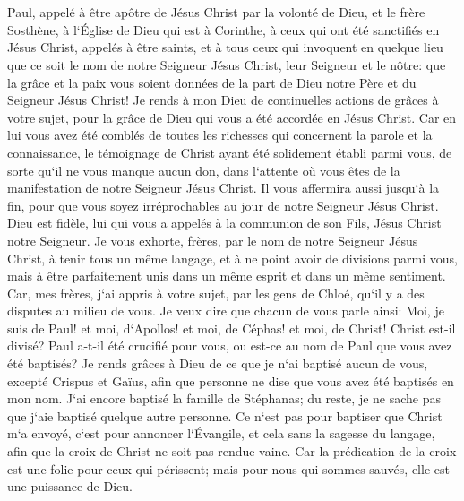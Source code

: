 

\chapter{}

\verse Paul, appelé à être apôtre de Jésus Christ par la volonté de Dieu, et le frère Sosthène, 
\verse à l`Église de Dieu qui est à Corinthe, à ceux qui ont été sanctifiés en Jésus Christ, appelés à être saints, et à tous ceux qui invoquent en quelque lieu que ce soit le nom de notre Seigneur Jésus Christ, leur Seigneur et le nôtre: 
\verse que la grâce et la paix vous soient données de la part de Dieu notre Père et du Seigneur Jésus Christ! 
\verse Je rends à mon Dieu de continuelles actions de grâces à votre sujet, pour la grâce de Dieu qui vous a été accordée en Jésus Christ. 
\verse Car en lui vous avez été comblés de toutes les richesses qui concernent la parole et la connaissance, 
\verse le témoignage de Christ ayant été solidement établi parmi vous, 
\verse de sorte qu`il ne vous manque aucun don, dans l`attente où vous êtes de la manifestation de notre Seigneur Jésus Christ. 
\verse Il vous affermira aussi jusqu`à la fin, pour que vous soyez irréprochables au jour de notre Seigneur Jésus Christ. 
\verse Dieu est fidèle, lui qui vous a appelés à la communion de son Fils, Jésus Christ notre Seigneur. 
\verse Je vous exhorte, frères, par le nom de notre Seigneur Jésus Christ, à tenir tous un même langage, et à ne point avoir de divisions parmi vous, mais à être parfaitement unis dans un même esprit et dans un même sentiment. 
\verse Car, mes frères, j`ai appris à votre sujet, par les gens de Chloé, qu`il y a des disputes au milieu de vous. 
\verse Je veux dire que chacun de vous parle ainsi: Moi, je suis de Paul! et moi, d`Apollos! et moi, de Céphas! et moi, de Christ! 
\verse Christ est-il divisé? Paul a-t-il été crucifié pour vous, ou est-ce au nom de Paul que vous avez été baptisés? 
\verse Je rends grâces à Dieu de ce que je n`ai baptisé aucun de vous, excepté Crispus et Gaïus, 
\verse afin que personne ne dise que vous avez été baptisés en mon nom. 
\verse J`ai encore baptisé la famille de Stéphanas; du reste, je ne sache pas que j`aie baptisé quelque autre personne. 
\verse Ce n`est pas pour baptiser que Christ m`a envoyé, c`est pour annoncer l`Évangile, et cela sans la sagesse du langage, afin que la croix de Christ ne soit pas rendue vaine. 
\verse Car la prédication de la croix est une folie pour ceux qui périssent; mais pour nous qui sommes sauvés, elle est une puissance de Dieu. 
